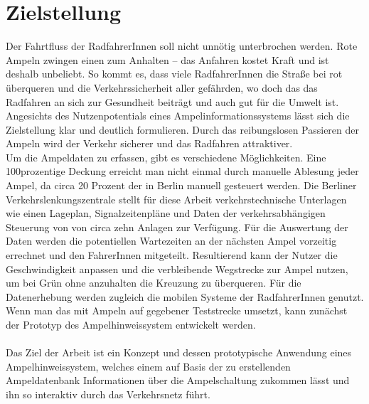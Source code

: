 \section{Zielstellung}
Der Fahrtfluss der RadfahrerInnen soll nicht unnötig unterbrochen werden. Rote Ampeln zwingen einen zum Anhalten -- das Anfahren kostet Kraft und ist deshalb unbeliebt. So kommt es, dass viele RadfahrerInnen die Straße bei rot überqueren und die Verkehrssicherheit aller gefährden, wo doch das das Radfahren an sich zur Gesundheit beiträgt und auch gut für die Umwelt ist. Angesichts des Nutzenpotentials eines Ampelinformationssystems lässt sich die Zielstellung klar und deutlich formulieren. Durch das reibungslosen Passieren der Ampeln wird der Verkehr sicherer und das Radfahren attraktiver.\\
Um die Ampeldaten zu erfassen, gibt es verschiedene Möglichkeiten. Eine 100prozentige Deckung erreicht man nicht einmal durch manuelle Ablesung jeder Ampel, da circa 20 Prozent der  in Berlin manuell gesteuert werden. Die Berliner Verkehrslenkungszentrale stellt für diese Arbeit verkehrstechnische Unterlagen wie einen Lageplan, Signalzeitenpläne und Daten der verkehrsabhängigen Steuerung von  von circa zehn Anlagen zur Verfügung.
Für die Auswertung der Daten werden die potentiellen Wartezeiten an der nächsten Ampel vorzeitig errechnet und den FahrerInnen mitgeteilt. Resultierend kann der Nutzer die Geschwindigkeit anpassen und die verbleibende Wegstrecke zur Ampel nutzen, um bei Grün ohne anzuhalten die Kreuzung zu überqueren. Für die Datenerhebung werden zugleich die mobilen Systeme der RadfahrerInnen genutzt.  Wenn man das mit Ampeln auf gegebener Teststrecke umsetzt, kann zunächst der Prototyp des Ampelhinweissystem entwickelt werden.\\\\
Das Ziel der Arbeit ist ein Konzept und dessen prototypische Anwendung eines Ampelhinweissystem, welches einem auf Basis der zu erstellenden  Ampeldatenbank Informationen über die Ampelschaltung zukommen lässt und ihn so interaktiv durch das Verkehrsnetz führt.
